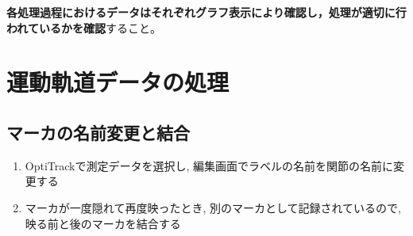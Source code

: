 \documentclass{jsarticle}
\begin{document}
\textbf{各処理過程におけるデータはそれぞれグラフ表示により確認し，処理が適切に行われているかを確認}すること。

\section{運動軌道データの処理}

\subsection{マーカの名前変更と結合}
\begin{enumerate}
  \item OptiTrackで測定データを選択し, 編集画面でラベルの名前を関節の名前に変更する
  \item マーカが一度隠れて再度映ったとき, 別のマーカとして記録されているので, 映る前と後のマーカを結合する
\end{enumerate}


\end{document}
